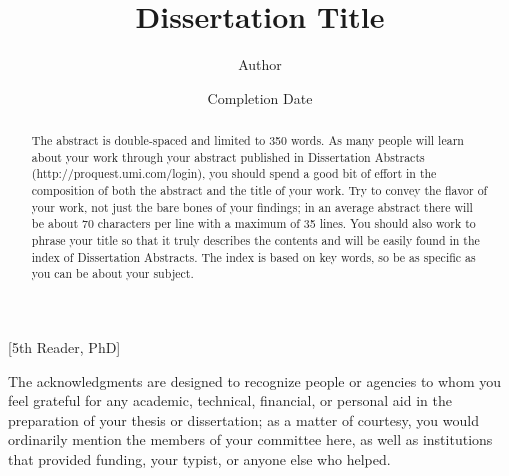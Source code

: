 \documentclass{iuphd}
\begin{document}
\title{Dissertation Title}
\author{Author}
\date{Completion Date}
\maketitle

[5th Reader, PhD]%

\copyrightpage


\begin{acknowledgments}
The acknowledgments are designed to recognize people or agencies to whom you feel grateful for any academic,
technical, financial, or personal aid in the preparation of your thesis or dissertation; as a matter of
courtesy, you would ordinarily mention the members of your committee here, as well as institutions that
provided funding, your typist, or anyone else who helped.
\end{acknowledgments}


\begin{abstract}
 The abstract is double-spaced and limited to 350 words. As many people will learn about
your work through your abstract published in Dissertation Abstracts (http://proquest.umi.com/login),
you should spend a good bit of effort in the composition of both the abstract and the title of your work.
Try to convey the flavor of your work, not just the bare bones of your findings; in an average abstract
there will be about 70 characters per line with a maximum of 35 lines. You should also work to phrase your
title so that it truly describes the contents and will be easily found in the index of Dissertation Abstracts.
The index is based on key words, so be as specific as you can be about your subject. 
\end{abstract}

\tableofcontents






%
\end{document}
